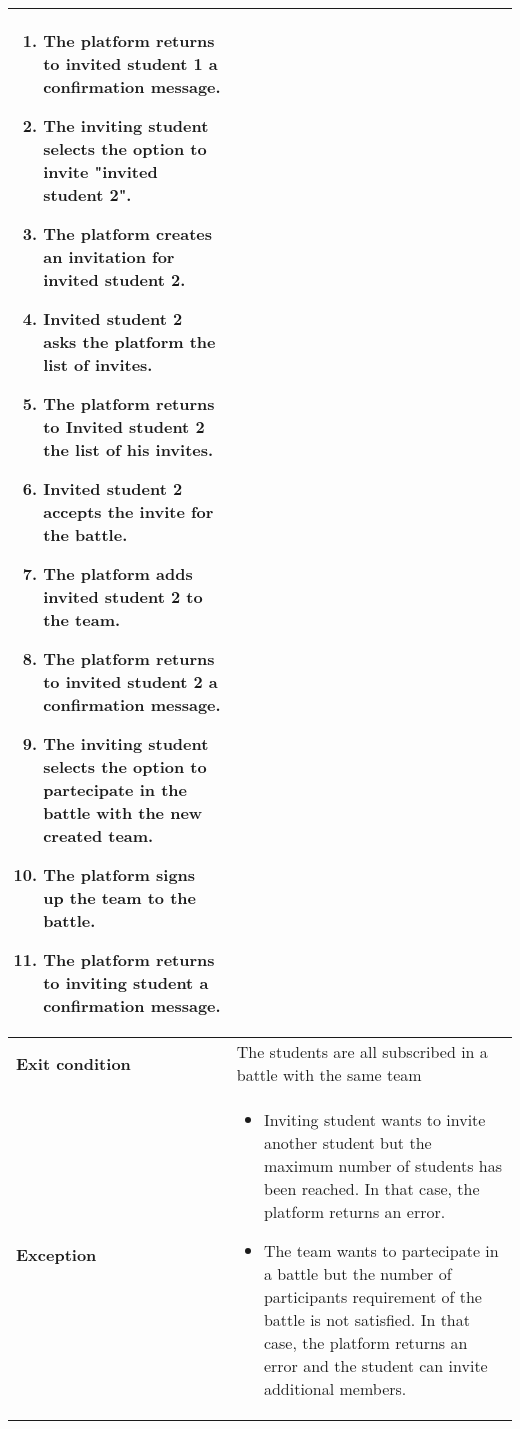 \begin{enumerate}[label=\textbf{UC\arabic*}:,ref=UC\arabic*,leftmargin=1.3cm]
{\begin{table}[H]
\begin{tabular}{|l|p{11.9cm}|}
\begin{enumerate}[label=\arabic*.]
                              \item The platform returns to invited student 1 a confirmation message.
                              \item The inviting student selects the option to invite "invited student 2".
                              \item The platform creates an invitation for invited student 2.
                              \item Invited student 2 asks the platform the list of invites.
                              \item The platform returns to Invited student 2 the list of his invites.
                              \item Invited student 2 accepts the invite for the battle.
                              \item The platform adds invited student 2 to the team.
                              \item The platform returns to invited student 2 a confirmation message.
                              \item The inviting student selects the option to partecipate in the battle with the new created team.
                              \item The platform signs up the team to the battle.
                              \item The platform returns to inviting student a confirmation message.
                        \end{enumerate}                    \\\hline
                        \textbf{Exit condition}  & The students are all subscribed in a battle with the same team              \\\hline
                        \textbf{Exception}       & \begin{itemize}
                              \item Inviting student wants to invite another student but the maximum number of students has been reached.
                              In that case, the platform returns an error.
                              \item The team wants to partecipate in a battle but the number of participants requirement of the battle is not satisfied.
                        In that case, the platform returns an error and the student can invite additional members.
                        \end{itemize}            \\\hline

\end{tabular}
\end{table}}
\end{enumerate}
